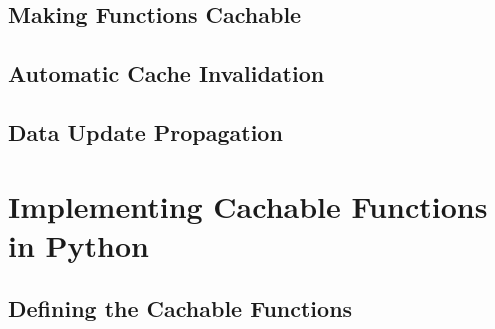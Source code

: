 

\subsection{Making Functions Cachable}
\label{subsec:making_functions_cachable}



\subsection{Automatic Cache Invalidation}
\label{subsec:automatic_cache_invalidation}


\subsection{Data Update Propagation}
\label{subsec:model_data_update_propagation}


\section{Implementing Cachable Functions in Python}
\label{sec:implementing_cachable_functions_in_python}

\subsection{Defining the Cachable Functions}
\label{subsec:defining_the_cachable_functions}





